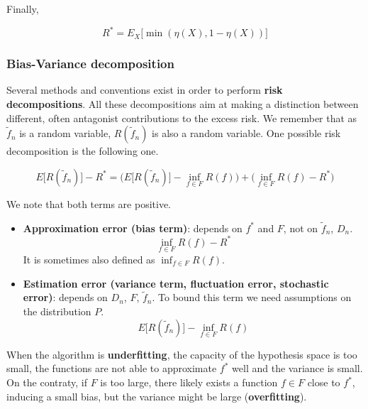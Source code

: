 \documentclass[
10pt, %
a4paper, %
oneside, %
headinclude,footinclude, %
BCOR5mm, %
]{scrartcl}
\begin{document}
    Finally,

    \begin{equation}
	R^* = E_X\Big[ \min(\eta(X), 1-\eta(X))\Big]
    \end{equation}

\subsubsection{\large\color{Periwinkle}Bias-Variance decomposition}

Several methods and conventions exist in order to perform \textbf{{risk decompositions}}. All these decompositions aim at making a distinction between different, often antagonist contributions to the excess risk. We remember that as $ \tilde{f}_n$ is a random variable, $ R(\tilde{f}_n)$ is also a random variable. One possible risk decomposition is the following one.

\begin{equation*}
    E\big[R( \tilde{f}_n)\big]-R^* = \Big(E\big[R( \tilde{f}_n)\big]- \inf_{f\in F}R(f)\Big) +\Big(\inf_{f\in F}R(f)-R^* \Big)
\end{equation*}

We note that both terms are positive.

\begin{itemize}
    \item \textbf{{Approximation error (bias term)}}: depends on $f^*$ and $F$, not on $ \tilde{f}_n$, $D_n$.
	\begin{equation*}
	    \inf_{f\in F}R(f)-R^*
	\end{equation*}
	It is sometimes also defined as $\inf_{f\in F}R(f)$.
    \item \textbf{{Estimation error (variance term, fluctuation error, stochastic error)}}: depends on $D_n$, $F$, $ \tilde{f}_n$. To bound this term we need assumptions on the distribution $P$.
	\begin{equation*}
	    E\big[R( \tilde{f}_n)\big]- \inf_{f\in F}R(f)
	\end{equation*}
\end{itemize}


When the algorithm is \textbf{{underfitting}}, the capacity of the hypothesis space is too small, the functions are not able to approximate $f^*$ well and the variance is small. On the contraty, if $F$ is too large, there likely exists a function $f\in F$ close to $f^*$, inducing a small bias, but the variance might be large (\textbf{{overfitting}}).
\end{document}
